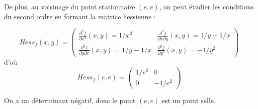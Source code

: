 \begin{enumerate}
{			De plus, au voisinage du point stationnaire $(e,e)$, on peut étudier les conditions du second ordre en formant la matrice hessienne : 
			
			$$Hess_f(x,y)=\begin{pmatrix} 
				\frac{\partial^2 f}{\partial x^2}(x,y) = 1/x^2 & \frac{\partial^2 f}{\partial x \partial y}(x,y) = 1/y-1/x \\
				\frac{\partial^2 f}{\partial y \partial x}(x,y) = 1/y-1/x & \frac{\partial^2 f}{\partial y^2}(x,y) = -1/y^2 
			\end{pmatrix}$$
			d'où 
			$$Hess_f(e,e)=\begin{pmatrix} 
				1/e^2 &  0 \\
				0 & -1/e^2 
			\end{pmatrix}$$
			
			On a un déterminant négatif, donc le point $(e,e)$ est un point selle. 
		}
	\end{enumerate}

